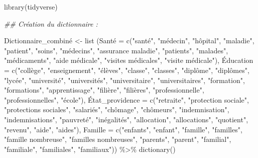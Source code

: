 \documentclass[
  letterpaper,
  DIV=11,
  numbers=noendperiod]{scrartcl}
\newenvironment{Shaded}{\begin{snugshade}}{\end{snugshade}}
\newcommand{\AttributeTok}[1]{\textcolor[rgb]{0.40,0.45,0.13}{#1}}
\newcommand{\DocumentationTok}[1]{\textcolor[rgb]{0.37,0.37,0.37}{\textit{#1}}}
\newcommand{\FunctionTok}[1]{\textcolor[rgb]{0.28,0.35,0.67}{#1}}
\newcommand{\NormalTok}[1]{\textcolor[rgb]{0.00,0.23,0.31}{#1}}
\newcommand{\OtherTok}[1]{\textcolor[rgb]{0.00,0.23,0.31}{#1}}
\newcommand{\SpecialCharTok}[1]{\textcolor[rgb]{0.37,0.37,0.37}{#1}}
\newcommand{\StringTok}[1]{\textcolor[rgb]{0.13,0.47,0.30}{#1}}
\begin{document}
\begin{Shaded}
\begin{Highlighting}[]
\FunctionTok{library}\NormalTok{(tidyverse)}

\DocumentationTok{\#\# Création du dictionnaire : }

\NormalTok{Dictionnaire\_combiné }\OtherTok{\textless{}{-}} \FunctionTok{list}\NormalTok{ (Santé }\OtherTok{=} \FunctionTok{c}\NormalTok{(}\StringTok{"santé"}\NormalTok{, }\StringTok{"médecin"}\NormalTok{, }\StringTok{"hôpital"}\NormalTok{, }\StringTok{"maladie"}\NormalTok{, }\StringTok{"patient"}\NormalTok{, }\StringTok{"soins"}\NormalTok{, }\StringTok{"médecins"}\NormalTok{, }\StringTok{"assurance maladie"}\NormalTok{, }\StringTok{"patients"}\NormalTok{, }\StringTok{"malades"}\NormalTok{, }\StringTok{"médicaments"}\NormalTok{, }\StringTok{"aide médicale"}\NormalTok{, }\StringTok{"visites médicales"}\NormalTok{, }\StringTok{"visite médicale"}\NormalTok{), É}\AttributeTok{ducation =} \FunctionTok{c}\NormalTok{(}\StringTok{"collège"}\NormalTok{, }\StringTok{"enseignement"}\NormalTok{, }\StringTok{"élèves"}\NormalTok{, }\StringTok{"classe"}\NormalTok{, }\StringTok{"classes"}\NormalTok{, }\StringTok{"diplôme"}\NormalTok{, }\StringTok{"diplômes"}\NormalTok{, }\StringTok{"lycée"}\NormalTok{, }\StringTok{"université"}\NormalTok{, }\StringTok{"universités"}\NormalTok{, }\StringTok{"universitaire"}\NormalTok{, }\StringTok{"universitaires"}\NormalTok{, }\StringTok{"formation"}\NormalTok{, }\StringTok{"formations"}\NormalTok{, }\StringTok{"apprentissage"}\NormalTok{, }\StringTok{"filière"}\NormalTok{, }\StringTok{"filières"}\NormalTok{, }\StringTok{"professionnelle"}\NormalTok{, }\StringTok{"professionnelles"}\NormalTok{, }\StringTok{"école"}\NormalTok{), É}\AttributeTok{tat\_providence =} \FunctionTok{c}\NormalTok{(}\StringTok{"retraite"}\NormalTok{, }\StringTok{"protection sociale"}\NormalTok{, }\StringTok{"protections sociales"}\NormalTok{, }\StringTok{"salariés"}\NormalTok{, }\StringTok{"chômage"}\NormalTok{, }\StringTok{"chômeurs"}\NormalTok{, }\StringTok{"indemnisation"}\NormalTok{, }\StringTok{"indemnisations"}\NormalTok{, }\StringTok{"pauvreté"}\NormalTok{, }\StringTok{"inégalités"}\NormalTok{, }\StringTok{"allocation"}\NormalTok{, }\StringTok{"allocations"}\NormalTok{, }\StringTok{"quotient"}\NormalTok{, }\StringTok{"revenu"}\NormalTok{, }\StringTok{"aide"}\NormalTok{, }\StringTok{"aides"}\NormalTok{), }\AttributeTok{Famille =} \FunctionTok{c}\NormalTok{(}\StringTok{"enfants"}\NormalTok{, }\StringTok{"enfant"}\NormalTok{, }\StringTok{"famille"}\NormalTok{, }\StringTok{"familles"}\NormalTok{, }\StringTok{"famille nombreuse"}\NormalTok{, }\StringTok{"familles nombreuses"}\NormalTok{, }\StringTok{"parents"}\NormalTok{, }\StringTok{"parent"}\NormalTok{, }\StringTok{"familial"}\NormalTok{, }\StringTok{"familiale"}\NormalTok{, }\StringTok{"familiales"}\NormalTok{, }\StringTok{"familiaux"}\NormalTok{)) }\SpecialCharTok{\%\textgreater{}\%} \FunctionTok{dictionary}\NormalTok{()}



\end{Highlighting}
\end{Shaded}
\end{document}
